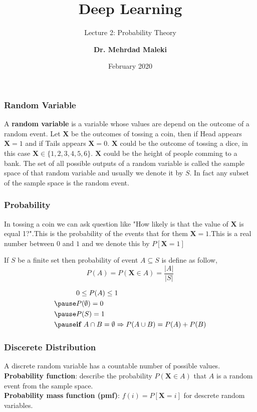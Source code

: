 \documentclass[12pt,aspectratio=169]{beamer}
\title[Finite Automata] %
{Deep Learning}
\subtitle{Lecture 2: Probability Theory}
\date{February 2020}
\author[]{\textbf{Dr. Mehrdad Maleki}}
\date{}
\begin{document}
 
\frame{\titlepage}

\newcommand{\SYSTEM}[2]{\raisebox{-1ex}{\shortstack{#1\\[-0.25ex]\tiny #2}}}
\newcommand{\YES}{\textcolor{dkgreen}{$\ballotcheck$}}
\newcommand{\NOPE}{\textcolor{dkred}{$\ballotx$}}
\newcommand{\MAYBE}{\textcolor{dkblue}{\textbf{?}}}


\begin{frame}
\frametitle{Random Variable}
A \textbf{random variable} is a variable whose values are depend on the outcome of a random event. \pause
Let $\mathbf{X}$ be the outcomes of tossing a coin, then if Head appears $\mathbf{X}=1$ and if Tails appears $\mathbf{X}=0$. \pause $\mathbf{X}$ could be the outcome of tossing a dice, in this case $\mathbf{X}\in \{1,2,3,4,5,6\}$. $\mathbf{X}$ could be the height of people comming to a bank. \pause The set of all possible outputs of a random variable is called the sample space of that random variable and usually we denote it by $S$. \pause In fact any subset of the sample space is the random event.

\end{frame}


\begin{frame}
\frametitle{Probability}
In tossing a coin we can ask question like "How likely is that the value of $\mathbf{X}$ is equal 1?".\pause This is the probability of the events that for them $\mathbf{X}=1$.\pause This is a real number between $0$ and $1$ and we denote this by $P[\mathbf{X}=1]$ 
\end{frame}

\begin{frame}
If $S$ be a finite set then probability of event $A\subseteq S$ is define as follow,
\[
P(A)=P(\mathbf{X}\in A)=\frac{|A|}{|S|}
\]
\end{frame}

\begin{frame}
\[
\begin{aligned}
& 0\leq P(A) \leq 1\\ \pause
& P(\emptyset)=0\\ \pause
& P(S)=1\\ \pause
& \textbf{if } A\cap B=\emptyset \Rightarrow P(A\cup B)=P(A)+P(B)
\end{aligned}
\]
\end{frame}


\begin{frame}
\frametitle{Discerete Distribution}
A discrete random variable has a countable number of possible values.\pause\\
\textbf{Probability function}: describe the probability $P(\mathbf{X}\in A)$ that $A$ is a random event from the sample space.\pause\\
\textbf{Probability mass function (pmf)}: $f(i)=P[\mathbf{X}=i]$ for descrete random variables.

\end{frame}
\end{document}
